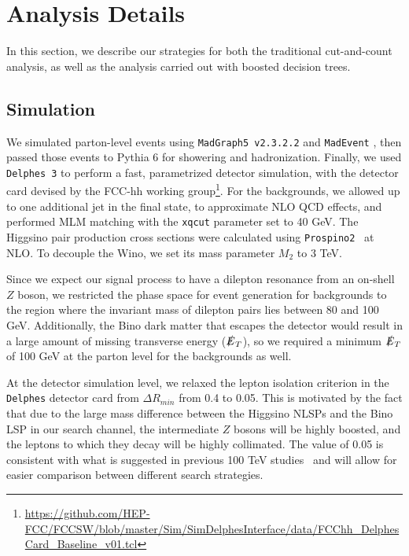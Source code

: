 \documentclass[a4paper,11pt]{article}
\newcommand{\met}{{\slashed{E}_T}}
\begin{document}
 

\section{Analysis Details}\label{sec:analysis}

In this section, we  describe our strategies for both the traditional
cut-and-count analysis, as well as the analysis carried out with boosted
decision trees. 

\subsection{Simulation}\label{simulation}

We simulated parton-level events using \texttt{MadGraph5 v2.3.2.2} and
\texttt{MadEvent} \cite{Alwall:2014hca}, then passed those events to Pythia 6
\cite{Sjostrand:2006za} for showering and hadronization. Finally, we used
\texttt{Delphes 3} \cite{deFavereau:2013fsa} to perform a fast, parametrized
detector simulation, with the detector card devised by the FCC-hh working
group\footnote{\url{https://github.com/HEP-FCC/FCCSW/blob/master/Sim/SimDelphesInterface/data/FCChh_DelphesCard_Baseline_v01.tcl}}.
For the backgrounds, we allowed up to one additional jet in the final state, to
approximate NLO QCD effects, and performed MLM matching with the \texttt{xqcut}
parameter set to 40 GeV. The Higgsino pair production cross sections were
calculated using \texttt{Prospino2}~\cite{Beenakker:1999xh} at NLO.  
To decouple the Wino, we set its mass parameter $M_2$ to 3 TeV.  

Since we expect our signal process to have a dilepton resonance from an on-shell
$Z$ boson, we restricted the phase space for event generation for backgrounds to
the region where the invariant mass of dilepton pairs lies between 80 and 100
GeV. Additionally, the Bino dark matter that escapes the detector would result
in a large amount of missing transverse energy ($\met$), so we required
a minimum $\met$ of 100 GeV at the parton level for the backgrounds as
well.  

At the detector simulation level, we relaxed the lepton isolation criterion in the
\texttt{Delphes} detector card from $\Delta R_{min}$ from 0.4 to 0.05. This is
motivated by the fact that due to the large mass difference between the Higgsino
NLSPs and the Bino LSP in our search channel, the intermediate $Z$ bosons will be
highly boosted, and the leptons to which they decay will be highly collimated.
The value of 0.05 is consistent with what is suggested in previous 100 TeV
studies~\cite{Acharya:2014pua,Gori:2014oua,Bramante:2014tba} and will allow
for easier comparison between different search strategies.   
\end{document}
